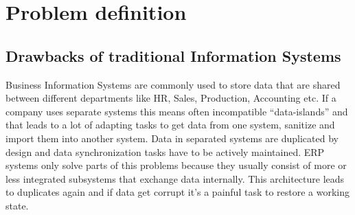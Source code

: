 
\renewcommand{\thefigure}{\arabic{figure}}
\captionsetup{width=0.8\textwidth}



\section*{Problem definition}

\subsection*{Drawbacks of traditional Information Systems}

Business Information Systems are commonly used to store data that are shared between different departments like HR, Sales, Production, Accounting etc.
If a company uses separate systems this means often incompatible ``data-islands'' and that leads to a lot of adapting tasks to get data from one system, sanitize and import them into another system.
Data in separated systems are duplicated by design and data synchronization tasks have to be actively maintained.
ERP systems only solve parts of this problems because they usually consist of more or less integrated subsystems that exchange data internally.
This architecture leads to duplicates again and if data get corrupt it's a painful task to restore a working state.


